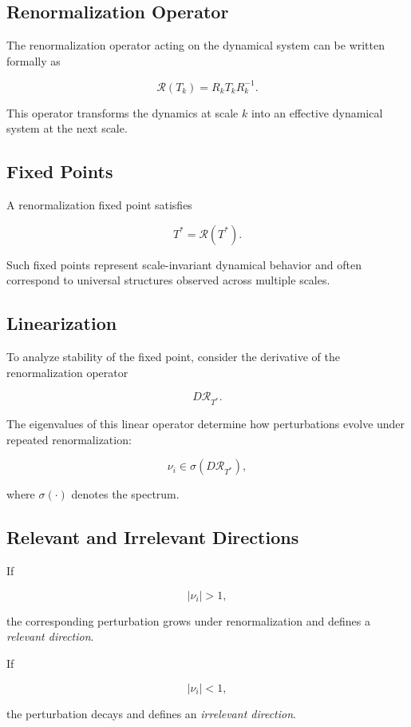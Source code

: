 \documentclass[12pt]{article}
\begin{document}
\subsection{Renormalization Operator}

The renormalization operator acting on the dynamical system can be written formally as

\[
\mathcal{R}(T_k)=R_k T_k R_k^{-1}.
\]

This operator transforms the dynamics at scale $k$ into an effective dynamical system at the next scale.

\subsection{Fixed Points}

A renormalization fixed point satisfies

\[
T^* = \mathcal{R}(T^*).
\]

Such fixed points represent scale-invariant dynamical behavior and often correspond to universal structures observed across multiple scales.

\subsection{Linearization}

To analyze stability of the fixed point, consider the derivative of the renormalization operator

\[
D\mathcal{R}_{T^*}.
\]

The eigenvalues of this linear operator determine how perturbations evolve under repeated renormalization:

\[
\nu_i \in \sigma(D\mathcal{R}_{T^*}),
\]

where $\sigma(\cdot)$ denotes the spectrum.

\subsection{Relevant and Irrelevant Directions}

If

\[
|\nu_i| > 1,
\]

the corresponding perturbation grows under renormalization and defines a \emph{relevant direction}.

If

\[
|\nu_i| < 1,
\]

the perturbation decays and defines an \emph{irrelevant direction}.
\end{document}
